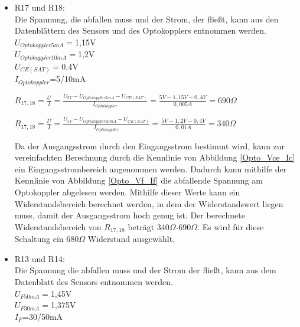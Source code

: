 \begin{itemize}
\item R17 und R18: \\
Die Spannung, die abfallen muss und der Strom, der fließt, kann aus den Datenblättern des Sensors und des Optokopplers entnommen werden.\\
$U_{Optokoppler 5mA}=$1,15V \\
$U_{Optokoppler 10mA}=$1,2V \\
$U_{CE(SAT)}=$0,4V \\
$I_{Optokoppler}$=5/10mA \\

\begin{center}
$R_{17,18}=\frac{U}{I}=\frac{U_{5V}-U_{Optokoppler 5mA}-U_{CE(SAT)}}{I_{Optokoppler}}=\frac{5V-1,15V-0,4V}{0,005A}=690\Omega$
\end{center}

\begin{center}
$R_{17,18}=\frac{U}{I}=\frac{U_{5V}-U_{Optokoppler 10mA}-U_{CE(SAT)}}{I_{Optokoppler}}=\frac{5V-1,2V-0,4V}{0,01A}=340\Omega$
\end{center}

Da der Ausgangsstrom durch den Eingangsstrom bestimmt wird, kann zur vereinfachten Berechnung durch die Kennlinie von Abbildung \ref{Opto_Vce_Ic} ein Eingangsstrombereich angenommen werden. Dadurch kann mithilfe der Kennlinie von Abbildung \ref{Opto_Vf_If} die abfallende Spannung am Optokoppler abgelesen werden. Mithilfe dieser Werte kann ein Widerstandsbereich berechnet werden, in dem der Widerstandswert liegen muss, damit der Ausgangsstrom hoch genug ist. Der berechnete Widerstandsbereich von $R_{17,18}$ beträgt 340$\Omega$-690$\Omega$. Es wird für diese Schaltung ein 680$\Omega$ Widerstand ausgewählt.
\newpage
\item R13 und R14:\\
Die Spannung die abfallen muss und der Strom der fließt, kann aus dem Datenblatt des Sensors entnommen werden.\\
$U_{F 50mA}=$1,45V \\
$U_{F 30mA}=$1,375V \\
$I_{F}$=30/50mA \\


\end{itemize}

